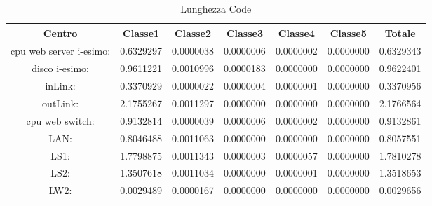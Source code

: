\begin{table}[H]
\begin{center}\begin{scriptsize}
\begin{tabular}{||c|c|c|c|c|c|c||}
\hline
Centro &Classe1 &Classe2 &Classe3 &Classe4 &Classe5 &Totale\\
\hline
\hline
 cpu web server i-esimo: 	&0.6329297	&0.0000038	&0.0000006	&0.0000002	&0.0000000	&0.6329343\\
\hline
 disco i-esimo: 	&0.9611221	&0.0010996	&0.0000183	&0.0000000	&0.0000000	&0.9622401\\
\hline
 inLink: 	&0.3370929	&0.0000022	&0.0000004	&0.0000001	&0.0000000	&0.3370956\\
\hline
 outLink: 	&2.1755267	&0.0011297	&0.0000000	&0.0000000	&0.0000000	&2.1766564\\
\hline
 cpu web switch: 	&0.9132814	&0.0000039	&0.0000006	&0.0000002	&0.0000000	&0.9132861\\
\hline
 LAN: 	&0.8046488	&0.0011063	&0.0000000	&0.0000000	&0.0000000	&0.8057551\\
\hline
 LS1: 	&1.7798875	&0.0011343	&0.0000003	&0.0000057	&0.0000000	&1.7810278\\
\hline
 LS2: 	&1.3507618	&0.0011034	&0.0000000	&0.0000001	&0.0000000	&1.3518653\\
\hline
 LW2: 	&0.0029489	&0.0000167	&0.0000000	&0.0000000	&0.0000000	&0.0029656\\
\hline
\end{tabular}
\end{scriptsize}\end{center}
\caption{Lunghezza Code}
\label{lunghezzacode}
\end{table}


